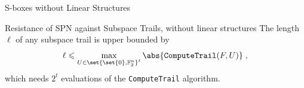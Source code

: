 \documentclass[%
    10pt,
    professionalfont,
    aspectratio=169,
    handout,
]{beamer}
\newcommand{\F}{\mathbb{F}}
\begin{document}
\begin{frame}{S-boxes without Linear Structures}
    \centering
    \begin{minipage}{0.72\textwidth}
    \begin{block}{Resistance of SPN against Subspace Trails, without linear structures}
    \centering
    The length $\ell$ of any subspace trail is upper bounded by
    \begin{equation*}
        \ell \leqslant \max_{U \in \set{\set{0}, \F_2^n}^t} \abs{\texttt{ComputeTrail}(F, U)}\;,
    \end{equation*}
    which needs $2^t$ evaluations of the \texttt{ComputeTrail} algorithm.
    \end{block}
    \end{minipage}
\end{frame}

%
%
%
\end{document}

